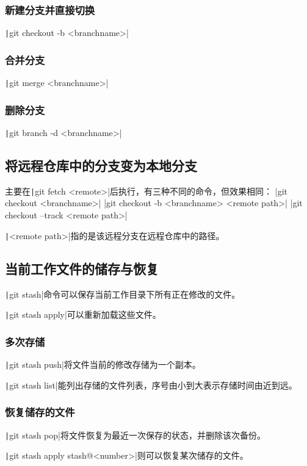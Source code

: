 \documentclass[fontset=ubuntu]{ctexart}
\begin{document}
\subsubsection{新建分支并直接切换}
\texttt|git checkout -b <branchname>|

\subsubsection{合并分支}
\texttt|git merge <branchname>|

\subsubsection{删除分支}
\texttt|git branch -d <branchname>|

\subsection{将远程仓库中的分支变为本地分支}
主要在\texttt|git fetch <remote>|后执行，有三种不同的命令，但效果相同：
|git checkout  <branchname>|
|git checkout -b <branchname> <remote path>|
|git checkout  --track <remote path>|

\texttt|<remote path>|指的是该远程分支在远程仓库中的路径。

\subsection{当前工作文件的储存与恢复}
\texttt|git stash|命令可以保存当前工作目录下所有正在修改的文件。

\texttt|git stash apply|可以重新加载这些文件。

\subsubsection{多次存储}
\texttt|git stash push|将文件当前的修改存储为一个副本。

\texttt|git stash list|能列出存储的文件列表，序号由小到大表示存储时间由近到远。

\subsubsection{恢复储存的文件}
\texttt|git stash pop|将文件恢复为最近一次保存的状态，并删除该次备份。

\texttt|git stash apply stash@{<number>}|则可以恢复某次储存的文件。
\end{document}
